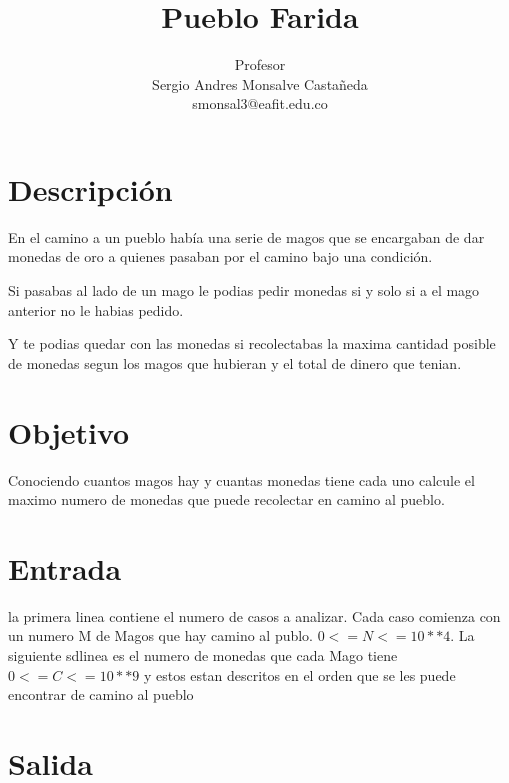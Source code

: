 \documentclass[11pt,letterpaper]{article}
\title{
        Pueblo Farida}
\author{
	Profesor\\
	Sergio Andres Monsalve Castañeda\\
	smonsal3@eafit.edu.co
}
\begin{document}
 
\pagestyle{fancyplain}
\fancyhf{}
\headheight=20pt %
\renewcommand{\headrulewidth}{0pt} %


\fancyfoot[c]{\thepage}

\maketitle

\begin{minipage}{3cm}
\end{minipage}


\section{Descripción}

En el camino a un pueblo había una serie de magos que se encargaban de dar monedas de oro a quienes pasaban por el camino bajo una condición.

Si pasabas al lado de un mago le podias pedir monedas si y solo si a el mago anterior no le habias pedido.

Y te podias quedar con las monedas si recolectabas la  maxima  cantidad posible de monedas segun los magos que hubieran y el total de dinero que tenian.

\section{Objetivo}

Conociendo cuantos magos hay y cuantas monedas tiene cada uno calcule el maximo numero de monedas que puede recolectar en camino al pueblo. 


\section{Entrada}

la primera linea contiene el numero de casos a analizar. Cada caso comienza con un numero M de Magos que hay camino al publo. $0 <= N <= 10**4$. La siguiente sdlinea es el numero de monedas que cada Mago tiene $0 <= C <= 10**9$ y estos estan descritos en el orden que se les puede encontrar de camino al pueblo


\section{Salida}
\end{document}
